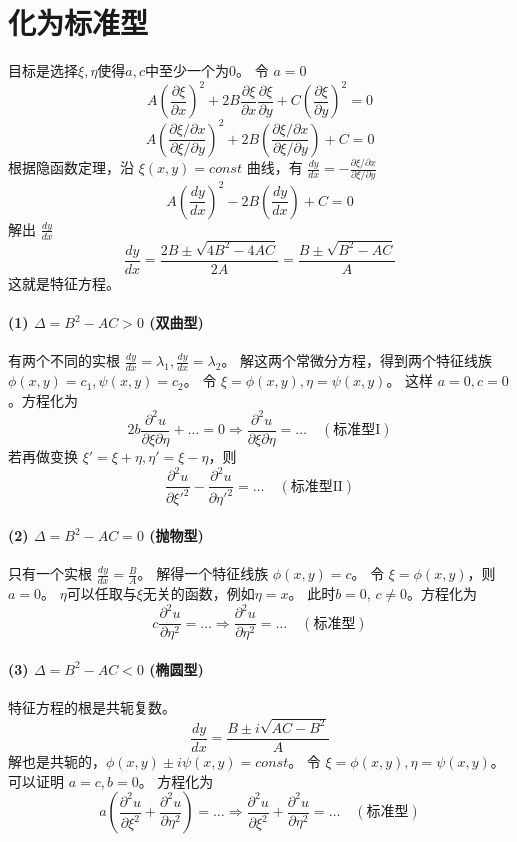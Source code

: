 \documentclass{article}
\begin{document}
	\section*{化为标准型}
	目标是选择$\xi, \eta$使得$a,c$中至少一个为0。
	令 $a=0$
	$$ A(\frac{\partial \xi}{\partial x})^2 + 2B \frac{\partial \xi}{\partial x} \frac{\partial \xi}{\partial y} + C(\frac{\partial \xi}{\partial y})^2 = 0 $$
	$$ A \left(\frac{\partial \xi / \partial x}{\partial \xi / \partial y}\right)^2 + 2B \left(\frac{\partial \xi / \partial x}{\partial \xi / \partial y}\right) + C = 0 $$
	根据隐函数定理，沿 $\xi(x,y)=const$ 曲线，有 $\frac{dy}{dx} = - \frac{\partial \xi / \partial x}{\partial \xi / \partial y}$
	$$ A\left(\frac{dy}{dx}\right)^2 - 2B\left(\frac{dy}{dx}\right) + C = 0 $$
	解出 $\frac{dy}{dx}$
	$$ \frac{dy}{dx} = \frac{2B \pm \sqrt{4B^2 - 4AC}}{2A} = \frac{B \pm \sqrt{B^2 - AC}}{A} $$
	这就是特征方程。
	
	\paragraph{(1) $\Delta = B^2 - AC > 0$ (双曲型)}
	有两个不同的实根 $\frac{dy}{dx} = \lambda_1, \frac{dy}{dx} = \lambda_2$。
	解这两个常微分方程，得到两个特征线族 $\phi(x,y) = c_1, \psi(x,y)=c_2$。
	令 $\xi = \phi(x,y), \eta = \psi(x,y)$。
	这样 $a=0, c=0$。方程化为
	$$ 
	2b \frac{\partial^2 u}{\partial \xi \partial \eta} + \dots = 0 \Rightarrow \frac{\partial^2 u}{\partial \xi \partial \eta} = \dots \quad (\text{标准型I}) 
	$$
	若再做变换 $\xi' = \xi+\eta, \eta' = \xi-\eta$，则
	$$ 
	\frac{\partial^2 u}{\partial \xi'^2} - \frac{\partial^2 u}{\partial \eta'^2} = \dots \quad (\text{标准型II}) 
	$$
	
	\paragraph{(2) $\Delta = B^2 - AC = 0$ (抛物型)}
	只有一个实根 $\frac{dy}{dx} = \frac{B}{A}$。
	解得一个特征线族 $\phi(x,y)=c$。
	令 $\xi = \phi(x,y)$，则 $a=0$。
	$\eta$可以任取与$\xi$无关的函数，例如$\eta=x$。
	此时$b=0$, $c \neq 0$。方程化为
	$$ 
	c \frac{\partial^2 u}{\partial \eta^2} = \dots \Rightarrow \frac{\partial^2 u}{\partial \eta^2} = \dots \quad (\text{标准型}) 
	$$
	
	\paragraph{(3) $\Delta = B^2 - AC < 0$ (椭圆型)}
	特征方程的根是共轭复数。
	$$ \frac{dy}{dx} = \frac{B \pm i\sqrt{AC-B^2}}{A} $$
	解也是共轭的，$\phi(x,y) \pm i\psi(x,y) = const$。
	令 $\xi = \phi(x,y), \eta = \psi(x,y)$。
	可以证明 $a=c, b=0$。
	方程化为
	$$ 
	a\left(\frac{\partial^2 u}{\partial \xi^2} + \frac{\partial^2 u}{\partial \eta^2}\right) = \dots \Rightarrow \frac{\partial^2 u}{\partial \xi^2} + \frac{\partial^2 u}{\partial \eta^2} = \dots \quad (\text{标准型}) 
	$$
	
\end{document}
